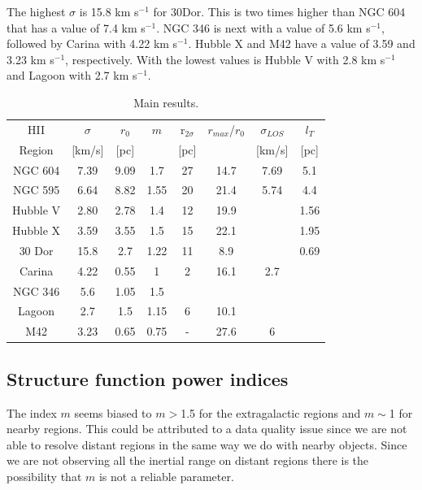 \documentclass[fleqn,usenatbib, useAMS, a4paper]{mnras}
\begin{document}
The highest \(\sigma\) is 15.8 km s\(^{-1}\) for 30Dor. This is two times higher than NGC 604 that has a value of 7.4 km s\(^{-1}\). NGC 346 is next with a value of 5.6 km s\(^{-1}\), followed by Carina with 4.22 km s\(^{-1}\). Hubble X and M42 have a value of 3.59 and 3.23 km s\(^{-1}\), respectively. With the lowest values is Hubble V with 2.8 km s\(^{-1}\) and Lagoon with 2.7 km s\(^{-1}\).     

\begin{table}
\begin{center}\caption{Main results.}
\begin{tabular}{cccccccc}\hline
HII    &  \(\sigma\) &   \(r_0\) &    \(m\)   & r$_{2\sigma}$ &  \(r_{max}\)/\(r_0\) & \(\sigma_{LOS}\)& \(l_T\) \\
    Region    &  [km/s]  &   [pc]    &       & [pc] &  &[km/s]&    [pc] \\\hline
NGC 604   &  7.39    &   9.09    &   1.7  & 27  & 14.7 &  7.69&  5.1 \\
NGC 595   &  6.64    &   8.82    &   1.55 & 20  & 21.4 & 5.74& 4.4 \\
Hubble V  &  2.80    &   2.78    &   1.4  &  12  & 19.9 & & 1.56 \\ 
Hubble X  &  3.59    &   3.55    &   1.5  &  15  & 22.1 & & 1.95 \\       
30 Dor    &  15.8    &   2.7     &   1.22 &  11  & 8.9 &  & 0.69 \\  
Carina    &  4.22    &   0.55    &    1   &   2   &  16.1  &  2.7&  \\
NGC 346   &   5.6    &  1.05     &    1.5    &      &  & & \\
Lagoon    &  2.7     &   1.5     &   1.15 &   6   & 10.1 &&     \\  
M42       &  3.23    &   0.65    &   0.75 &  -   & 27.6 & 6	& \\	  

\end{tabular}\label{tab:Res}
\end{center}
\end{table}

\subsection{Structure function power indices}

The index \(m\) seems biased to \(m>\)1.5 for the extragalactic regions and \(m\sim\)1 for nearby regions. This could be attributed to a data quality issue since we are not able to resolve distant regions in the same way we do with nearby objects. Since we are not observing all the inertial range on distant regions there is the possibility that \(m\) is not a reliable parameter.
\end{document}
